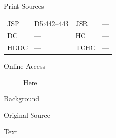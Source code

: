 			\begin{description}
					\item[Print Sources]
				\end{description}

					\begin{tabular}{p{0.5in}p{1in}p{0.5in}p{1in}}
					JSP	 	& D5:442--443		& JSR 		& --- \\
					DC	 	& ---				& HC 		& --- \\
					HDDC 	& ---				& TCHC 		& --- \\
					\end{tabular}
				
				\begin{description}
					\item[Online Access] \href{https://www.josephsmithpapers.org/paper-summary/minutes-17-september-1837-a/1}{Here}
				\end{description}
				
				\begin{description}
					\item[Background]
				\end{description}
				
				
				\begin{description}
					\item[Original Source]
				\end{description}
				
				
				\begin{description}
					\item[Text]
				\end{description}
				
